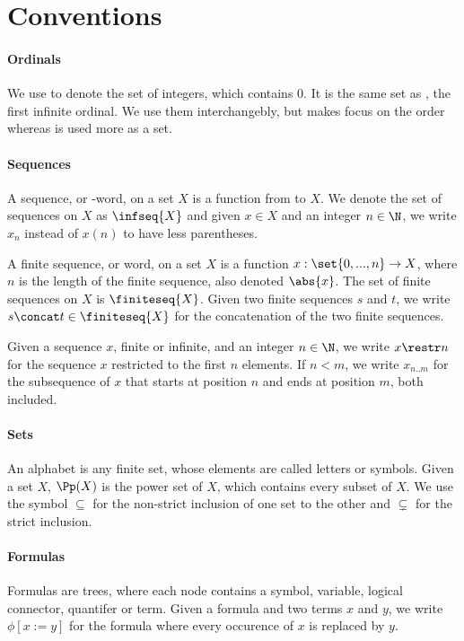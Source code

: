 
\tableofcontents


\clearpage
\section*{Conventions}

\paragraph{Ordinals}
We use \N to denote the set of integers, which contains 0.
It is the same set as \w, the first infinite ordinal.
We use them interchangebly, but \w makes focus on the order
whereas \N is used more as a set.

\paragraph{Sequences} A sequence, or \w-word, on a set $X$ is a function
from \w to $X$. We denote the set of sequences on $X$ as $\infseq{X}$
and given $x \in X$ and an integer $n \in \N$, we write $x_n$ instead of $x(n)$ to have less parentheses.

A finite sequence, or word, on a set $X$ is a function $x: \set{0, ..., n} \to X$,
where $n$ is the length of the finite sequence, also denoted $\abs{x}$.
The set of finite sequences on $X$ is $\finiteseq{X}$.
Given two finite sequences $s$ and $t$, we write $s \concat t \in \finiteseq{X}$
for the concatenation of the two finite sequences.

Given a sequence $x$, finite or infinite, and an integer $n \in \N$,
we write $x \restr n$ for the sequence $x$ restricted to the first $n$ elements.
If $n < m$, we write $x_{n..m}$ for the subsequence of $x$ that starts at
position $n$ and ends at position $m$, both included.

\paragraph{Sets}
An alphabet is any finite set, whose elements are called letters or symbols.
Given a set $X$, $\Pp(X)$ is the power set of $X$, which contains every subset of $X$.
We use the symbol $\subseteq$ for the non-strict inclusion of one set to the other
and $\subsetneq$ for the strict inclusion.

\paragraph{Formulas}
Formulas are trees, where each node contains a symbol, variable, logical connector,
quantifer or term. Given a formula \p and two terms $x$ and $y$,
we write $\phi[x := y]$ for the formula where every occurence of $x$ is replaced by $y$.

